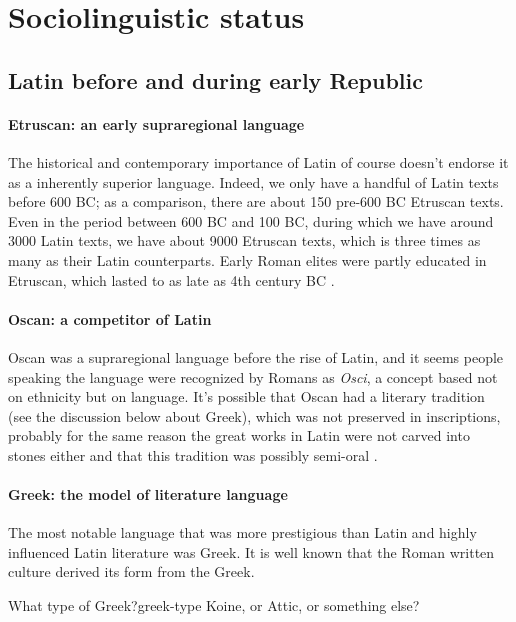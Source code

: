 \documentclass[a4paper, oneside, 12pt]{report}
\newcommand*{\citepage}[1]{p.~{#1}}
\newcommand{\form}[1]{\emph{#1}}
\begin{document}
\section{Sociolinguistic status}

\subsection{Latin before and during early Republic}

\paragraph*{Etruscan: an early supraregional language}
The historical and contemporary importance of Latin 
of course doesn't endorse it as a inherently superior language. 
Indeed, we only have a handful of Latin texts before 600 BC; 
as a comparison, there are about 150 pre-600 BC Etruscan texts.
Even in the period between 600 BC and 100 BC, 
during which we have around 3000 Latin texts,
we have about 9000 Etruscan texts, 
which is three times as many as their Latin counterparts. 
Early Roman elites were partly educated in Etruscan,
which lasted to as late as 4th century BC \citep[\citepage{43}]{leonhardt2013latin}.

\paragraph*{Oscan: a competitor of Latin}
Oscan was a supraregional language before the rise of Latin,
and it seems people speaking the language were recognized by Romans as \form{Osci},
a concept based not on ethnicity but on language.
It's possible that Oscan had a literary tradition (see the discussion below about Greek),
which was not preserved in inscriptions,
probably for the same reason the great works in Latin were not carved into stones either
and that this tradition was possibly semi-oral \citep[\citepage{51}]{leonhardt2013latin}.

\paragraph*{Greek: the model of literature language}
The most notable language that was more prestigious than Latin and highly influenced Latin literature was Greek.
It is well known that the Roman written culture derived its form from the Greek.

\begin{todobox}{What type of Greek?}{greek-type}
    Koine, or Attic, or something else?
\end{todobox}
\end{document}
